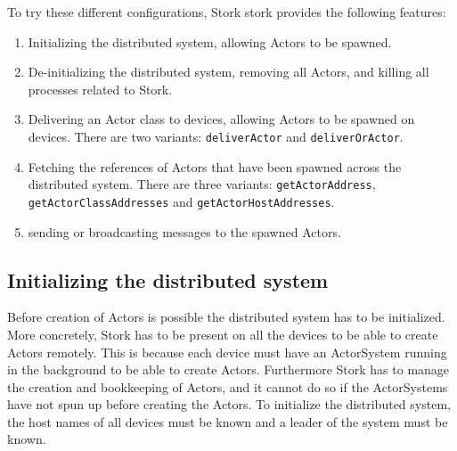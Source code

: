 \documentclass[a4paper]{article}
\begin{document}
To try these different configurations, Stork stork provides the following features:
\begin{enumerate}
    \item Initializing the distributed system, allowing Actors to be spawned.
    \item De-initializing the distributed system, removing all Actors, and killing all processes related to Stork.
    \item Delivering an Actor class to devices, allowing Actors to be spawned on devices. There are two variants: \lstinline{deliverActor} and \lstinline|deliverOrActor|.
    \item Fetching the references of Actors that have been spawned across the distributed system. There are three variants: \lstinline|getActorAddress|, \lstinline|getActorClassAddresses| and \lstinline|getActorHostAddresses|.
    \item sending or broadcasting messages to the spawned Actors.
\end{enumerate}
\subsection{Initializing the distributed system}
Before creation of Actors is possible the distributed system has to be initialized. More concretely, Stork has to be present on all the devices to be able to create Actors remotely. This is because each device must have an ActorSystem running in the background to be able to create Actors. Furthermore Stork has to manage the creation and bookkeeping of Actors, and it cannot do so if the ActorSystems have not spun up before creating the Actors. To initialize the distributed system, the host names of all devices must be known and a leader of the system must be known.
\end{document}
